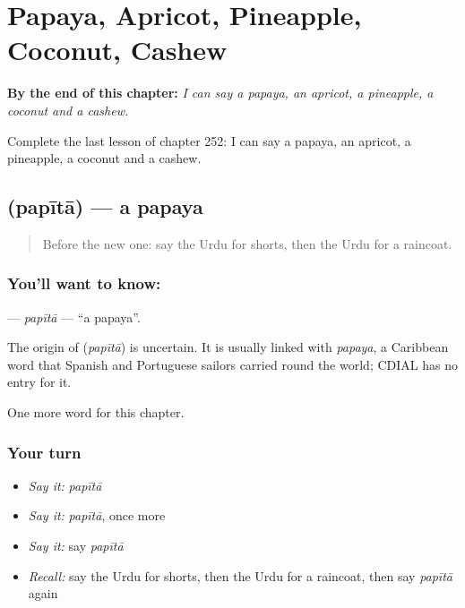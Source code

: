 
\chapter{Papaya, Apricot, Pineapple, Coconut, Cashew}
\label{ch:ur-papaya-apricot-pineapple-coconut-cashew}

\begin{chapteropening}
\textbf{By the end of this chapter:} \emph{I can say a papaya, an apricot, a pineapple, a coconut and a cashew.}

Complete the last lesson of chapter 252: I can say a papaya, an apricot, a pineapple, a coconut and a cashew.
\end{chapteropening}

\section[\texorpdfstring{\ur{پپیتا} (papītā)}{پپیتا (papītā)}]{ (papītā) — a papaya}

\label{lesson:UR-C252-papita}



\begin{quote}
Before the new one: say the Urdu for shorts, then the Urdu for a raincoat.
\end{quote}

\subsection*{You'll want to know: }
\textbf{} — \emph{papītā} — \textquotedblleft{}a papaya\textquotedblright{}.

\begin{cousinweb}
The origin of \textbf{} (\emph{papītā}) is uncertain. It is usually linked with \emph{papaya}, a Caribbean word that Spanish and Portuguese sailors carried round the world; CDIAL has no entry for it.
\end{cousinweb}

\begin{grammarlens}[title={What you've built}]
One more word for this chapter.
\end{grammarlens}

\subsection*{Your turn}
\begin{itemize}
\raggedright
  \item \emph{Say it:} \emph{papītā}
  \item \emph{Say it:} \emph{papītā}, once more
  \item \emph{Say it:} say \emph{papītā}
  \item \emph{Recall:} say the Urdu for shorts, then the Urdu for a raincoat, then say \emph{papītā} again
\end{itemize}


